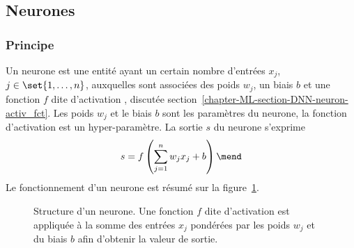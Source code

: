 \subsection{Neurones}\label{chapter-ML-section-DNN-neuron}
\subsubsection{Principe}
Un neurone est une entité ayant
un certain nombre d'entrées $x_j$, $j\in\set{1,\ldots,n}$,
auxquelles sont associées des poids $w_j$,
un biais $b$
et
une fonction $f$ dite d'\og activation \fg, discutée section~\ref{chapter-ML-section-DNN-neuron-activ_fct}.
Les poids $w_j$ et le biais $b$ sont les paramètres du neurone,
la fonction d'activation est un hyper-paramètre.
La sortie $s$ du neurone s'exprime
\begin{equation}
s = f\left(\sum_{j=1}^n w_jx_j + b\right)
\mend
\end{equation}
Le fonctionnement d'un neurone est résumé sur la figure~\ref{fig-chapter-ML-section-DNN-neuron-neuron_structure}.
\begin{figure}[h]
\centering

\caption[Structure d'un neurone.]{Structure d'un neurone. Une fonction $f$ dite d'\og activation \fg{} est appliquée à la somme des entrées $x_j$ pondérées par les poids $w_j$ et du biais $b$ afin d'obtenir la valeur de sortie.}
\label{fig-chapter-ML-section-DNN-neuron-neuron_structure}
\end{figure}
